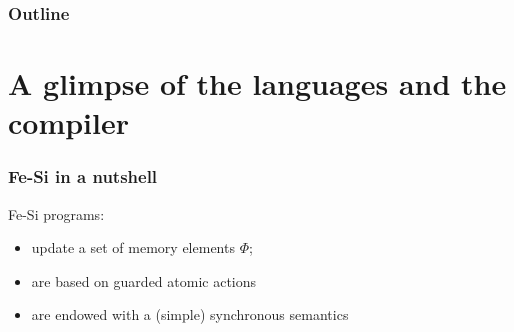 \documentclass[9pt]{beamer}
\newcommand\fesi{Fe-Si}
\begin{document}

\begin{frame}
  \frametitle{Outline}       
  \tableofcontents  
\end{frame}



\section{A glimpse of the languages and the compiler}
\begin{frame}[fragile]
  \frametitle{\fesi{} in a nutshell}

  \fesi{} programs:
  \begin{itemize}
  \item update a set of \alert{memory elements} $\Phi$;
    \\
  \item are based on \alert{guarded atomic actions} 
    \\
    \begin{center}
    \end{center}
  \item are endowed with a (simple) \alert{synchronous semantics}
    \\
    \begin{center}
    \end{center}
  \end{itemize}
\end{frame}
\end{document}
